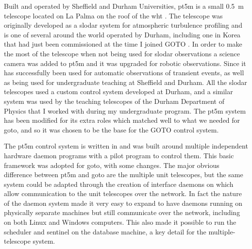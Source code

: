 \begin{colsection}
\begin{colsection}
Built and operated by Sheffield and Durham Universities, \gls{pt5m} is a small \SI{0.5}{\metre} telescope located on La Palma on the roof of the \gls{wht} \citep{pt5m}. The telescope was originally developed as a \gls{slodar} system for atmospheric turbulence profiling \citep{SLODAR_LaPalma} and is one of several around the world operated by Durham, including one in Korea that had just been commissioned at the time I joined GOTO \citep{SLODAR_Korea}. In order to make the most of the telescope when not being used for \gls{slodar} observations a science camera was added to \gls{pt5m} and it was upgraded for robotic observations. Since it has successfully been used for automatic observations of transient events, as well as being used for undergraduate teaching at Sheffield and Durham. All the \gls{slodar} telescopes used a custom control system developed at Durham, and a similar system was used by the teaching telescopes of the Durham Department of Physics that I worked with during my undergraduate program. The \gls{pt5m} system has been modified for its extra roles which matched well to what we needed for \gls{goto}, and so it was chosen to be the base for the GOTO control system.

The \gls{pt5m} control system is written in  and was built around multiple independent hardware daemon programs with a pilot program to control them. This basic framework was adopted for \gls{goto}, with some changes. The major obvious difference between \gls{pt5m} and \gls{goto} are the multiple unit telescopes, but the same system could be adapted through the creation of interface daemons on which allow communication to the unit telescopes over the network. In fact the nature of the daemon system made it very easy to expand to have daemons running on physically separate machines but still communicate over the network, including on both Linux and Windows computers. This also made it possible to run the scheduler and sentinel on the database machine, a key detail for the multiple-telescope system.


\end{colsection}
\end{colsection}
